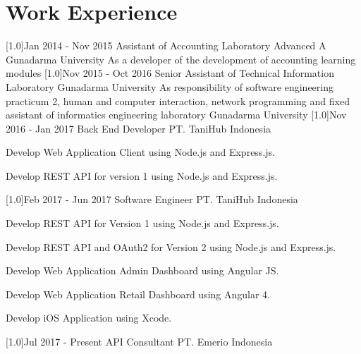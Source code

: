 \documentclass[english]{cv-style}
\begin{document}
\section{Work Experience}
  \vspace{-0.3cm}
\begin{entrylist}
\entry
  {\scalebox{.6}[1.0]{Jan 2014 - Nov 2015}}
  {Assistant of Accounting Laboratory Advanced A}
  {Gunadarma University}
  {As a developer of the development of accounting learning modules}
\entry
  {\scalebox{.6}[1.0]{Nov 2015 - Oct 2016}}
  {Senior Assistant of Technical Information Laboratory}
  {Gunadarma University}
  {As responsibility of software engineering practicum 2, human and computer interaction, network programming and fixed assistant of informatics engineering laboratory Gunadarma University}
\entry
  {\scalebox{.6}[1.0]{Nov 2016 - Jan 2017}}
  {Back End Developer}
  {PT. TaniHub Indonesia}
  {\vspace{-0.3cm}
  \begin{itemize}\small{
    \item Develop Web Application Client using Node.js and Express.js.
    \item Develop REST API for version 1 using Node.js and Express.js.}
  \end{itemize}}
\entry
  {\scalebox{.6}[1.0]{Feb 2017 - Jun 2017}}
  {Software Engineer}
  {PT. TaniHub Indonesia}
  {\vspace{-0.3cm}
  \begin{itemize}\small{
    \item Develop REST API for Version 1 using Node.js and Express.js.
    \item Develop REST API and OAuth2 for Version 2 using Node.js and Express.js.
    \item Develop Web Application Admin Dashboard using Angular JS.
    \item Develop Web Application Retail Dashboard using Angular 4.
    \item Develop iOS Application using Xcode.}
  \end{itemize}}
\entry
  {\scalebox{.6}[1.0]{Jul 2017 - Present}}
  {API Consultant}
  {PT. Emerio Indonesia}
  {\vspace{-0.3cm}
  \begin{itemize}\small{
}
\end{itemize}}
\end{entrylist}
\end{document}
